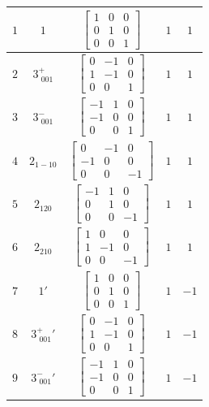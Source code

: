 \documentclass[fleqn,8pt]{jsarticle}
\begin{document}
\begin{longtable}{ccccc}
$ 1 $ & $ 1 $ & $ \begin{bmatrix} 1 & 0 & 0 \\ 0 & 1 & 0 \\ 0 & 0 & 1 \end{bmatrix} $ & $ 1 $ & $ 1 $ \\ \hline
$ 2 $ & $ 3^{+}_{\,\,001} $ & $ \begin{bmatrix} 0 & -1 & 0 \\ 1 & -1 & 0 \\ 0 & 0 & 1 \end{bmatrix} $ & $ 1 $ & $ 1 $ \\ \hline
$ 3 $ & $ 3^{-}_{\,\,001} $ & $ \begin{bmatrix} -1 & 1 & 0 \\ -1 & 0 & 0 \\ 0 & 0 & 1 \end{bmatrix} $ & $ 1 $ & $ 1 $ \\ \hline
$ 4 $ & $ 2{}_{1-10} $ & $ \begin{bmatrix} 0 & -1 & 0 \\ -1 & 0 & 0 \\ 0 & 0 & -1 \end{bmatrix} $ & $ 1 $ & $ 1 $ \\ \hline
$ 5 $ & $ 2{}_{120} $ & $ \begin{bmatrix} -1 & 1 & 0 \\ 0 & 1 & 0 \\ 0 & 0 & -1 \end{bmatrix} $ & $ 1 $ & $ 1 $ \\ \hline
$ 6 $ & $ 2{}_{210} $ & $ \begin{bmatrix} 1 & 0 & 0 \\ 1 & -1 & 0 \\ 0 & 0 & -1 \end{bmatrix} $ & $ 1 $ & $ 1 $ \\ \hline
$ 7 $ & $ 1{}' $ & $ \begin{bmatrix} 1 & 0 & 0 \\ 0 & 1 & 0 \\ 0 & 0 & 1 \end{bmatrix} $ & $ 1 $ & $ -1 $ \\ \hline
$ 8 $ & $ 3^{+}_{\,\,001}{}' $ & $ \begin{bmatrix} 0 & -1 & 0 \\ 1 & -1 & 0 \\ 0 & 0 & 1 \end{bmatrix} $ & $ 1 $ & $ -1 $ \\ \hline
$ 9 $ & $ 3^{-}_{\,\,001}{}' $ & $ \begin{bmatrix} -1 & 1 & 0 \\ -1 & 0 & 0 \\ 0 & 0 & 1 \end{bmatrix} $ & $ 1 $ & $ -1 $ \\ \hline

\end{longtable}
\end{document}
